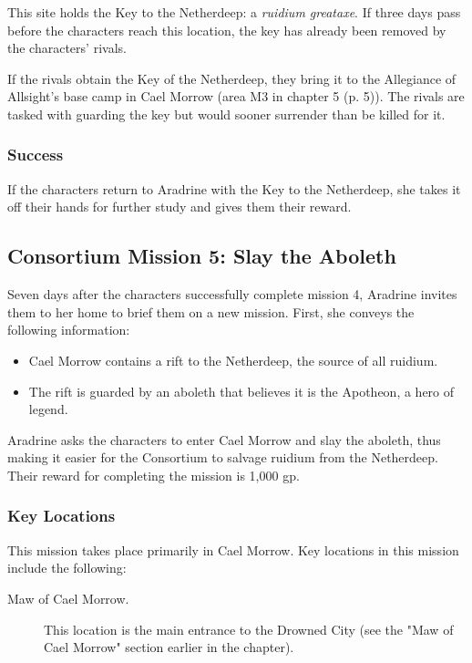 \documentclass[a4paper, 11pt, bg=full, twocolumn, nooutline]{dndbook}
\begin{document}
This site holds the Key to the Netherdeep: a \textit{ruidium greataxe}. If three days pass before the characters reach this location, the key has already been removed by the characters' rivals.

If the rivals obtain the Key of the Netherdeep, they bring it to the Allegiance of Allsight's base camp in Cael Morrow (area M3 in chapter 5 (p. 5)). The rivals are tasked with guarding the key but would sooner surrender than be killed for it.

\subsubsection{Success}

If the characters return to Aradrine with the Key to the Netherdeep, she takes it off their hands for further study and gives them their reward.

\subsection{Consortium Mission 5: Slay the Aboleth}

Seven days after the characters successfully complete mission 4, Aradrine invites them to her home to brief them on a new mission. First, she conveys the following information:

\begin{itemize}
\item Cael Morrow contains a rift to the Netherdeep, the source of all ruidium.
\item The rift is guarded by an aboleth that believes it is the Apotheon, a hero of legend.
\end{itemize}

Aradrine asks the characters to enter Cael Morrow and slay the aboleth, thus making it easier for the Consortium to salvage ruidium from the Netherdeep. Their reward for completing the mission is 1,000 gp.

\subsubsection{Key Locations}

This mission takes place primarily in Cael Morrow. Key locations in this mission include the following:

\begin{description}
\item[Maw of Cael Morrow.] This location is the main entrance to the Drowned City (see the "Maw of Cael Morrow" section earlier in the chapter).
\end{description}
\end{document}
